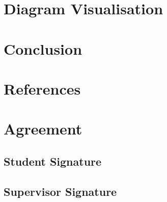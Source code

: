 \documentclass{article}
\begin{document}
    \section{Diagram Visualisation}
        

    \section{Conclusion}

    \section{References}
        

    \section{Agreement}
        \subsection{Student Signature}
            \vspace{1in}

        \subsection{Supervisor Signature}
            \vspace{1in}
\end{document}
